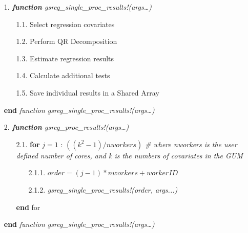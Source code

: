 \documentclass{juliacon}
\begin{document}
\begin{listing}
\hline
{}
\vspace{2mm}
\hline
  \begin{enumerate}
    
    \item[1.] \textit{\textbf{function} gsreg\_single\_proc\_results!(args…)}
    \begin{enumerate}
        \item[1.1.] Select regression covariates
        \item[1.2.] Perform QR Decomposition
        \item[1.3.] Estimate regression results
        \item[1.4.] Calculate additional tests
        \item[1.5.] Save individual results in a Shared Array
    \end{enumerate}
    \item[] \textbf{end} \textit{function gsreg\_single\_proc\_results!(args…)}

\vspace{2mm}
    
    \item[2.] \textit{\textbf{function} gsreg\_proc\_results!(args…)}
    \begin{enumerate}
        \item[2.1.] \textbf{for} $j=1$ : $((k^2-1)/ nworkers)$ \textit{\# where nworkers is the user defined number of cores, and k is the numbers of covariates in the GUM}
        \begin{enumerate}
            \item[2.1.1.] $order = (j -1) * nworkers + workerID$
            \item[2.1.2.] \textit{gsreg\_single\_proc\_results!(order, args...)}
        \end{enumerate}
        \item[] \textbf{end} for
    \end{enumerate}
    \item[] \textbf{end} \textit{function gsreg\_single\_proc\_results!(args…)}
    
\vspace{2mm}


\end{enumerate}
\end{listing}
\end{document}
